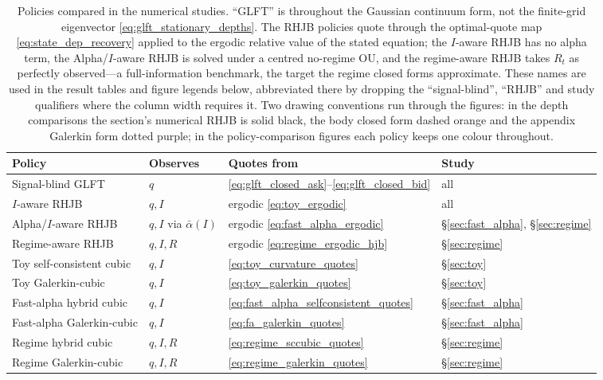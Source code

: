 \documentclass[11pt,a4paper]{article}
\newcommand{\alphabar}{\bar\alpha}
\theoremstyle{plain}
\theoremstyle{definition}
\begin{document}
\begin{table}[htbp]
\centering
\small
\caption{Policies compared in the numerical studies.  ``GLFT'' is throughout
the Gaussian continuum form, not the finite-grid eigenvector
\eqref{eq:glft_stationary_depths}.  The RHJB policies quote through the
optimal-quote map \eqref{eq:state_dep_recovery} applied to the ergodic relative
value of the stated equation; the \(I\)-aware RHJB has no alpha term, the
Alpha/\(I\)-aware RHJB is solved under a centred no-regime OU, and the
regime-aware RHJB takes \(R_t\) as perfectly observed---a full-information
benchmark, the target the regime closed forms approximate.  These names are
used in the result tables and figure legends below, abbreviated there by
dropping the ``signal-blind'', ``RHJB'' and study qualifiers where the column
width requires it.  Two drawing conventions run through the figures: in the
depth comparisons the section's numerical RHJB is solid black, the body closed
form dashed orange and the appendix Galerkin form dotted purple; in the
policy-comparison figures each policy keeps one colour throughout.}
\label{tab:policies}
\begin{tabular}{llll}
\toprule
Policy & Observes & Quotes from & Study\\
\midrule
Signal-blind GLFT & \(q\) & \eqref{eq:glft_closed_ask}--\eqref{eq:glft_closed_bid} & all\\
\(I\)-aware RHJB & \(q,I\) & ergodic \eqref{eq:toy_ergodic} & all\\
Alpha/\(I\)-aware RHJB & \(q,I\) via \(\alphabar(I)\) & ergodic \eqref{eq:fast_alpha_ergodic} & \S\ref{sec:fast_alpha}, \S\ref{sec:regime}\\
Regime-aware RHJB & \(q,I,R\) & ergodic \eqref{eq:regime_ergodic_hjb} & \S\ref{sec:regime}\\
Toy self-consistent cubic & \(q,I\) & \eqref{eq:toy_curvature_quotes} & \S\ref{sec:toy}\\
Toy Galerkin-cubic & \(q,I\) & \eqref{eq:toy_galerkin_quotes} & \S\ref{sec:toy}\\
Fast-alpha hybrid cubic & \(q,I\) & \eqref{eq:fast_alpha_selfconsistent_quotes} & \S\ref{sec:fast_alpha}\\
Fast-alpha Galerkin-cubic & \(q,I\) & \eqref{eq:fa_galerkin_quotes} & \S\ref{sec:fast_alpha}\\
Regime hybrid cubic & \(q,I,R\) & \eqref{eq:regime_sccubic_quotes} & \S\ref{sec:regime}\\
Regime Galerkin-cubic & \(q,I,R\) & \eqref{eq:regime_galerkin_quotes} & \S\ref{sec:regime}\\
\bottomrule
\end{tabular}
\end{table}
\end{document}
